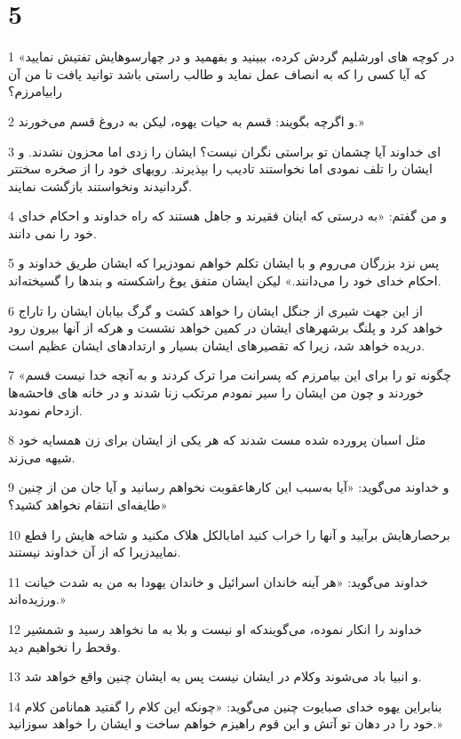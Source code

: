 \chapter{5}

\par 1 «در کوچه های اورشلیم گردش کرده، ببینید و بفهمید و در چهارسوهایش تفتیش نمایید که آیا کسی را که به انصاف عمل نماید و طالب راستی باشد توانید یافت تا من آن رابیامرزم؟
\par 2 و اگر‌چه بگویند: قسم به حیات یهوه، لیکن به دروغ قسم می‌خورند.»
\par 3 ‌ای خداوند آیا چشمان تو براستی نگران نیست؟ ایشان را زدی اما محزون نشدند. و ایشان را تلف نمودی اما نخواستند تادیب را بپذیرند. رویهای خود را از صخره سختتر گردانیدند ونخواستند بازگشت نمایند.
\par 4 و من گفتم: «به درستی که اینان فقیرند و جاهل هستند که راه خداوند و احکام خدای خود را نمی دانند.
\par 5 پس نزد بزرگان می‌روم و با ایشان تکلم خواهم نمودزیرا که ایشان طریق خداوند و احکام خدای خود را می‌دانند.» لیکن ایشان متفق یوغ راشکسته و بندها را گسیخته‌اند.
\par 6 از این جهت شیری از جنگل ایشان را خواهد کشت و گرگ بیابان ایشان را تاراج خواهد کرد و پلنگ برشهرهای ایشان در کمین خواهد نشست و هر‌که از آنها بیرون رود دریده خواهد شد، زیرا که تقصیرهای ایشان بسیار و ارتدادهای ایشان عظیم است.
\par 7 «چگونه تو را برای این بیامرزم که پسرانت مرا ترک کردند و به آنچه خدا نیست قسم خوردند و چون من ایشان را سیر نمودم مرتکب زنا شدند و در خانه های فاحشه‌ها ازدحام نمودند.
\par 8 مثل اسبان پرورده شده مست شدند که هر یکی از ایشان برای زن همسایه خود شیهه می‌زند.
\par 9 و خداوند می‌گوید: «آیا به‌سبب این کارهاعقوبت نخواهم رسانید و آیا جان من از چنین طایفه‌ای انتقام نخواهد کشید؟»
\par 10 برحصارهایش برآیید و آنها را خراب کنید امابالکل هلاک مکنید و شاخه هایش را قطع نماییدزیرا که از آن خداوند نیستند.
\par 11 خداوند می‌گوید: «هر آینه خاندان اسرائیل و خاندان یهودا به من به شدت خیانت ورزیده‌اند.»
\par 12 خداوند را انکار نموده، می‌گویندکه او نیست و بلا به ما نخواهد رسید و شمشیر وقحط را نخواهیم دید.
\par 13 و انبیا باد می‌شوند وکلام در ایشان نیست پس به ایشان چنین واقع خواهد شد.
\par 14 بنابراین یهوه خدای صبایوت چنین می‌گوید: «چونکه این کلام را گفتید همانامن کلام خود را در دهان تو آتش و این قوم راهیزم خواهم ساخت و ایشان را خواهد سوزانید.»
